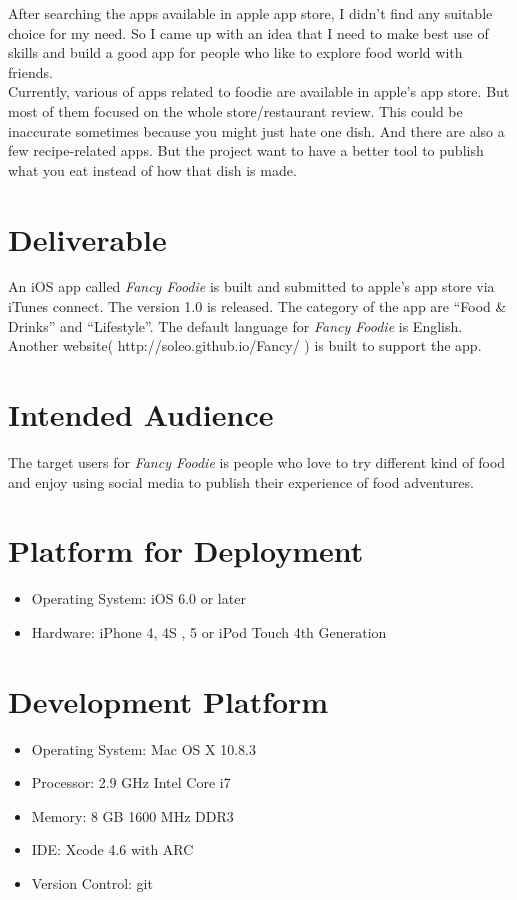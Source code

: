 After searching the apps available in apple app store, I didn't find any suitable choice for my need. So I came up with an idea that I need to make best use of skills and build a good app for people who like to explore food world with friends. \\

Currently, various of apps related to foodie are available in apple's app store. But most of them focused on the whole store/restaurant review. This could be inaccurate sometimes because you might just hate one dish. And there are also a few recipe-related apps. But the project want to have a better tool to publish what you eat instead of how that dish is made.

\section{Deliverable} %
\label{sec:deliverable}
An iOS app called \emph{Fancy Foodie} is built and submitted to apple's app store via iTunes connect. The version 1.0 is released. The category of the app are ``Food & Drinks'' and ``Lifestyle''. The default language for \emph{Fancy Foodie} is English. Another website( http://soleo.github.io/Fancy/ ) is built to support the app.

\section{Intended Audience} %
\label{sec:intended_audience}
The target users for \emph{Fancy Foodie} is people who love to try different kind of food and enjoy using social media to publish their experience of food adventures.

\section{Platform for Deployment} %
\label{sec:platform_for_deployment}
\begin{itemize}
\item Operating System: iOS 6.0 or later
\item Hardware: iPhone 4, 4S , 5 or iPod Touch 4th Generation
\end{itemize}

\section{Development Platform} %
\label{sec:development_platform}
\begin{itemize}
\item Operating System: Mac OS X 10.8.3 
\item Processor: 2.9 GHz Intel Core i7
\item Memory:  8 GB 1600 MHz DDR3
\item IDE: Xcode 4.6 with ARC
\item Version Control: git
\end{itemize}

